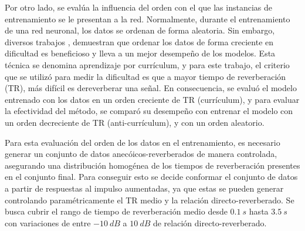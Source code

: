 Por otro lado, se evalúa la influencia del orden con el que las instancias de entrenamiento se le presentan a la red. Normalmente, durante el entrenamiento de una red neuronal, los datos se ordenan de forma aleatoria. Sin embargo, diversos trabajos \cite{cv, cl1, cl2}, demuestran que ordenar los datos de forma creciente en dificultad es beneficioso y lleva a un mejor desempeño de los modelos. Esta técnica se denomina aprendizaje por currículum, y para este trabajo, el criterio que se utilizó para medir la dificultad es que a mayor tiempo de reverberación (TR), más difícil es dereverberar una señal. En consecuencia, se evaluó el modelo entrenado con los datos en un orden creciente de TR (currículum), y para evaluar la efectividad del método, se comparó su desempeño con entrenar el modelo con un orden decreciente de TR (anti-currículum), y con un orden aleatorio.

Para esta evaluación del orden de los datos en el entrenamiento, es necesario generar un conjunto de datos anecóicos-reverberados de manera controlada, asegurando una distribución homogénea de los tiempos de reverberación presentes en el conjunto final. Para conseguir esto se decide conformar el conjunto de datos a partir de respuestas al impulso aumentadas, ya que estas se pueden generar controlando paramétricamente el TR medio y la relación directo-reverberado. Se busca cubrir el rango de tiempo de reverberación medio desde $0.1 \ s$ hasta $3.5 \ s$ con variaciones de entre $-10 \ dB$ a $10 \ dB$ de relación directo-reverberado. 
